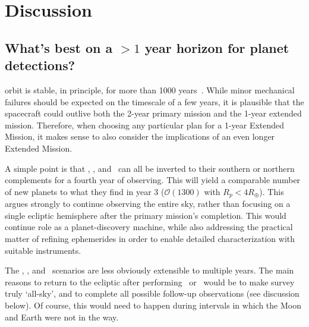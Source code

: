 \section{Discussion} 
\label{sec:discussion}

\subsection{What's best on a $>1$ year horizon for planet detections?}
\label{sec:gtr_1yr_horizon}

\tesss orbit is stable, in principle, for more than 1000 years~\citep{gangestad_high_2013}.
While minor mechanical failures should be expected on the timescale of a few years, it is plausible that the spacecraft could outlive both the 2-year primary mission and the 1-year extended mission.
Therefore, when choosing any particular plan for a 1-year Extended Mission, it makes
sense to also consider the implications of an even longer Extended Mission.

A simple point is that \nhemi, \npole, and \shemiAvoid\ can all be inverted to their southern or northern complements for a fourth year of observing.
This will yield a comparable number of new planets to what they find in year 3 ($\mathcal{O}(1300)$ with $R_p<4R_\oplus$).
This argues strongly to continue observing the entire sky, rather than focusing on a single ecliptic hemisphere after the primary mission's completion.
This would continue \tesss role as a planet-discovery machine, while also addressing the practical matter of refining ephemerides in order to enable detailed characterization with suitable instruments.

The \elong, \eshort, and \hemis\ scenarios are less obviously extensible to multiple years.
The main reasons to return to the ecliptic after performing \elong\ or \eshort\ would be to make \tesss survey truly `all-sky', and to complete all possible \ktwo follow-up observations (see discussion below).
Of course, this would need to happen during intervals in which the Moon and Earth were not in the way.


